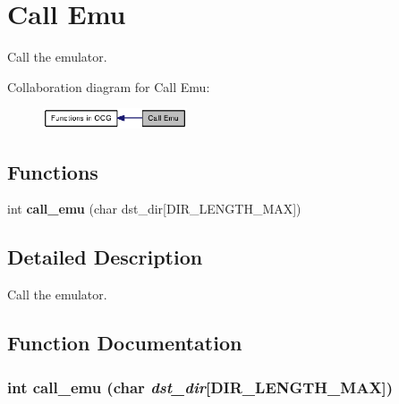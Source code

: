 \section{Call Emu}
\label{group____call__emu}
Call the emulator.  




Collaboration diagram for Call Emu:\nopagebreak
\begin{figure}[H]
\begin{center}
\leavevmode
\includegraphics[width=121pt]{group____call__emu}
\end{center}
\end{figure}
\subsection*{Functions}
\begin{CompactItemize}
\item 
int {\bf call\_\-emu} (char dst\_\-dir[DIR\_\-LENGTH\_\-MAX])
\end{CompactItemize}


\subsection{Detailed Description}
Call the emulator. 

\subsection{Function Documentation}
\subsubsection[{call\_\-emu}]{\setlength{\rightskip}{0pt plus 5cm}int call\_\-emu (char {\em dst\_\-dir}[DIR\_\-LENGTH\_\-MAX])}\label{group____call__emu_g24e7d3ae92f5cecf198c10a7232f4fec}


